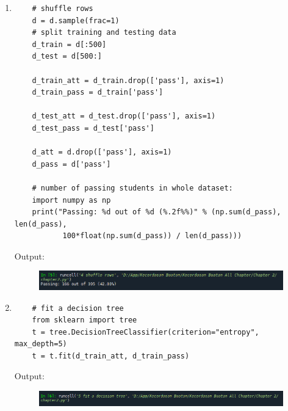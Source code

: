 \begin{enumerate}
\item
\begin{verbatim}
	# shuffle rows
	d = d.sample(frac=1)
	# split training and testing data
	d_train = d[:500]
	d_test = d[500:]

	d_train_att = d_train.drop(['pass'], axis=1)
	d_train_pass = d_train['pass']

	d_test_att = d_test.drop(['pass'], axis=1)
	d_test_pass = d_test['pass']

	d_att = d.drop(['pass'], axis=1)
	d_pass = d['pass']

	# number of passing students in whole dataset:
	import numpy as np
	print("Passing: %d out of %d (%.2f%%)" % (np.sum(d_pass), len(d_pass), 
	       100*float(np.sum(d_pass)) / len(d_pass)))
\end{verbatim}
\newline Output: 
\begin{figure}[!htbp]
	\centering
	\includegraphics[scale=0.5]{figures/chapter2/4.PNG}
\end{figure}

\item 
\begin{verbatim}
	# fit a decision tree
	from sklearn import tree
	t = tree.DecisionTreeClassifier(criterion="entropy", max_depth=5)
	t = t.fit(d_train_att, d_train_pass)
\end{verbatim}
\newline Output: 
\begin{figure}[!htbp]
	\centering
	\includegraphics[scale=0.5]{figures/chapter2/5.PNG}
\end{figure}


\end{enumerate}
